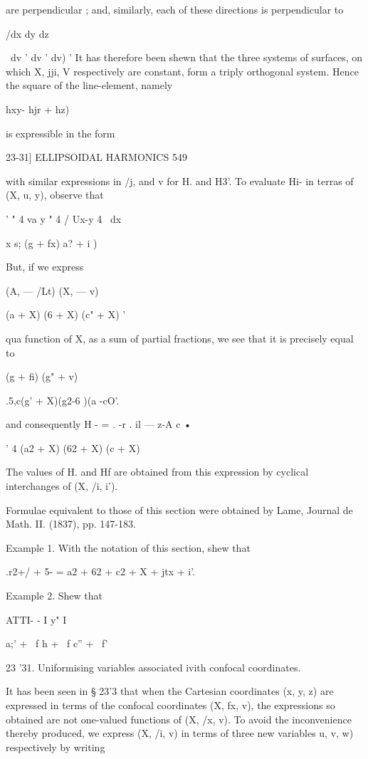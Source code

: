 {{are perpendicular ; and, similarly, each of these directions is
perpendicular to

/dx dy dz\

\ dv ' dv ' dv) ' It has therefore been shewn that the three systems
of surfaces, on which X, jji, V respectively are constant, form a
triply orthogonal system. Hence the square of the line-element, namely

 hxy- hjr + hz)\

is expressible in the form



23-31] ELLIPSOIDAL HARMONICS 549

with similar expressions in /j, and v for H. and H3'. To evaluate Hi-
in terras of (X, u, y), observe that

' " 4 va y " 4 / Ux-y 4 \ dx

 x s; (g + fx) a? + i )

But, if we express

(A, — /Lt) (X, — v)



(a + X) (6 + X) (c" + X) '

qua function of X, as a sum of partial fractions, we see that it is
precisely equal to

  (g + fi) (g" + v)

 .5,c(g' + X)(g2-6 )(a -cO'.

and consequently H - = . -r . il — z-A c •

  ' 4 (a2 + X) (62 + X) (c + X)

The values of H. and Hf are obtained from this expression by cyclical
interchanges of (X, /i, i').

Formulae equivalent to those of this section were obtained by Lame,
Journal de Math. II. (1837), pp. 147-183.

Example 1. With the notation of this section, shew that

.r2+/ + 5- = a2 + 62 + c2 + X + jtx + i'.

Example 2. Shew that

ATTI- - I y" I

   a;' + \ f h + \ f c'' + \ f'

23 '31. Uniformising variables associated ivith confocal coordinates.

It has been seen in § 23'3 that when the Cartesian coordinates (x, y,
z) are expressed in terms of the confocal coordinates (X, fx, v), the
expressions so obtained are not one-valued functions of (X, /x, v). To
avoid the inconvenience thereby produced, we express (X, /i, v) in
terms of three new variables u, v, w) respectively by writing

}}
